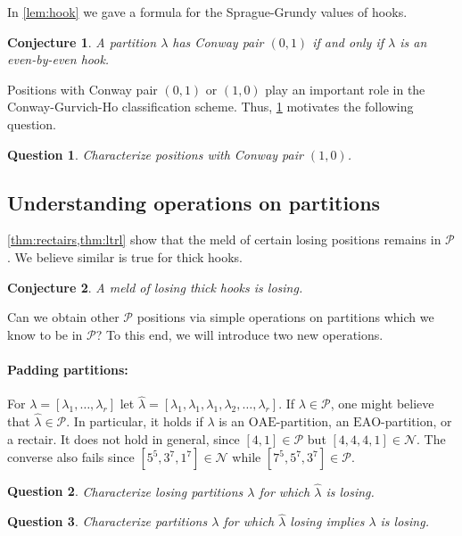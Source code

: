 \documentclass[pdflatex,sn-mathphys-num]{sn-jnl}%
\theoremstyle{thmstyleone}%
\theoremstyle{thmstyletwo}%
\theoremstyle{thmstylethree}%
\newtheorem{conj}{Conjecture}
\newtheorem{question}{Question}
\newcommand{\p}{\mathcal P}
\newcommand{\n}{\mathcal N}
\newcommand{\OAE}{\mathrm{OAE}}
\newcommand{\EAO}{\mathrm{EAO}}
\begin{document}
\bigskip
\noindent In \cref{lem:hook} we gave a formula for the Sprague-Grundy values of hooks. 
\begin{conj} \label{conj:hookswap}
    A partition $\lambda$ has Conway pair $(0, 1)$ if and only if $\lambda$ is an even-by-even hook. 
\end{conj} 
\noindent Positions with Conway pair $(0,1)$ or $(1,0)$ play an important role in the Conway-Gurvich-Ho classification scheme. Thus, \cref{conj:hookswap} motivates the following question. 
\begin{question}    
    Characterize positions with Conway pair $(1, 0)$. 
\end{question}

\subsection{Understanding operations on partitions}

\cref{thm:rectairs,thm:ltrl} show that 
the meld of certain losing positions remains in $\p$. 
We believe similar is true for thick hooks.
\begin{conj}
    A meld of losing thick hooks is losing.
\end{conj}

Can we obtain other $\p$ positions via simple operations on partitions which we know to be in $\p$? 
To this end, we will introduce two new operations.  

\paragraph{Padding partitions:} For $\lambda = [\lambda_1, \ldots, \lambda_r]$ let $\hat \lambda = [\lambda_1, \lambda_1, \lambda_1, \lambda_2, \ldots, \lambda_r]$. If $\lambda \in \p$, one might believe that $\hat \lambda \in \p$.
In particular, it holds if $\lambda$ is an $\OAE$-partition, an $\EAO$-partition, or a rectair. 
It does not hold in general, since $[4,1]\in \p$ but $[4,4,4,1] \in \n$. The converse also fails since $[5^5, 3^7, 1^7] \in \n$ while $[7^5, 5^7, 3^7] \in \p$.

\begin{question} \label{question:q1}
    Characterize losing partitions $\lambda$ for which $\hat \lambda$ is losing.
\end{question}
\begin{question} \label{question:q2}
    Characterize partitions $\lambda$ for which $\hat \lambda$ losing implies $\lambda$ is losing. 
\end{question}
\end{document}
